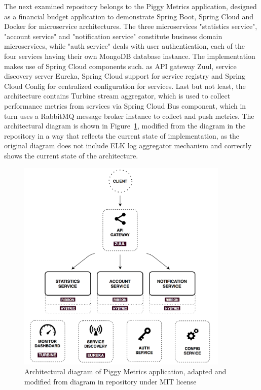 \documentclass{Configuration_Files/PoliMi3i_thesis}
\begin{document}
The next examined repository belongs to the Piggy Metrics application, designed as a financial budget application to demonstrate Spring Boot, Spring Cloud and Docker for microservice architectures.
The three microservices "statistics service", "account service" and "notification service" constitute business domain microservices, while "auth service" deals with user authentication, each of the four services having their own MongoDB database instance.
The implementation makes use of Spring Cloud components such. as API gateway Zuul, service discovery server Eureka, Spring Cloud support for service registry and Spring Cloud Config for centralized configuration for services.
Last but not least, the architecture contains Turbine stream aggregator, which is used to collect performance metrics from services via Spring Cloud Bus component, which in turn uses a RabbitMQ message broker instance to collect and push metrics.
The architectural diagram is shown in Figure~\ref{fig:R3_arch}, modified from the diagram in the repository in a way that reflects the current state of implementation, as the original diagram does not include ELK log aggregator mechanism and correctly shows the current state of the architecture.

\begin{figure}[H]
\centering
\includegraphics[width=0.9\textwidth]{myImages/R3.png}
\caption{Architectural diagram of Piggy Metrics application, adapted and modified from diagram in repository under MIT license}
\label{fig:R3_arch}
\end{figure}
\end{document}
